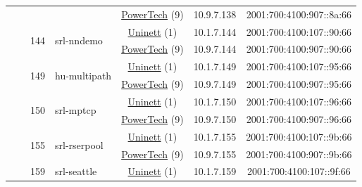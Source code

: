 \begin{small}
\begin{center}
\begin{longtable}{|c|c|c|c|c|c|c|c|}
  &  &  &  & \multicolumn{2}{|c|}{\tiny{\href{http://www.powertech.no}{PowerTech} (9)}} & \tiny{10.9.7.138} & \tiny{2001:700:4100:907::8a:66} \\* \cline{3-3}\cline{4-4}\cline{5-5}\cline{6-6}\cline{7-7}\cline{8-8}
  &  & \multirow{2}{*}{\tiny{144}} & \multicolumn{1}{|l|}{\multirow{2}{*}{\tiny{srl-nndemo}}} & \multicolumn{2}{|c|}{\tiny{\href{https://www.uninett.no}{Uninett} (1)}} & \tiny{10.1.7.144} & \tiny{2001:700:4100:107::90:66} \\* \cline{5-5}\cline{6-6}\cline{7-7}\cline{8-8}
  &  &  &  & \multicolumn{2}{|c|}{\tiny{\href{http://www.powertech.no}{PowerTech} (9)}} & \tiny{10.9.7.144} & \tiny{2001:700:4100:907::90:66} \\* \cline{3-3}\cline{4-4}\cline{5-5}\cline{6-6}\cline{7-7}\cline{8-8}
  &  & \multirow{2}{*}{\tiny{149}} & \multicolumn{1}{|l|}{\multirow{2}{*}{\tiny{hu-multipath}}} & \multicolumn{2}{|c|}{\tiny{\href{https://www.uninett.no}{Uninett} (1)}} & \tiny{10.1.7.149} & \tiny{2001:700:4100:107::95:66} \\* \cline{5-5}\cline{6-6}\cline{7-7}\cline{8-8}
  &  &  &  & \multicolumn{2}{|c|}{\tiny{\href{http://www.powertech.no}{PowerTech} (9)}} & \tiny{10.9.7.149} & \tiny{2001:700:4100:907::95:66} \\* \cline{3-3}\cline{4-4}\cline{5-5}\cline{6-6}\cline{7-7}\cline{8-8}
  &  & \multirow{2}{*}{\tiny{150}} & \multicolumn{1}{|l|}{\multirow{2}{*}{\tiny{srl-mptcp}}} & \multicolumn{2}{|c|}{\tiny{\href{https://www.uninett.no}{Uninett} (1)}} & \tiny{10.1.7.150} & \tiny{2001:700:4100:107::96:66} \\* \cline{5-5}\cline{6-6}\cline{7-7}\cline{8-8}
  &  &  &  & \multicolumn{2}{|c|}{\tiny{\href{http://www.powertech.no}{PowerTech} (9)}} & \tiny{10.9.7.150} & \tiny{2001:700:4100:907::96:66} \\* \cline{3-3}\cline{4-4}\cline{5-5}\cline{6-6}\cline{7-7}\cline{8-8}
  &  & \multirow{2}{*}{\tiny{155}} & \multicolumn{1}{|l|}{\multirow{2}{*}{\tiny{srl-rserpool}}} & \multicolumn{2}{|c|}{\tiny{\href{https://www.uninett.no}{Uninett} (1)}} & \tiny{10.1.7.155} & \tiny{2001:700:4100:107::9b:66} \\* \cline{5-5}\cline{6-6}\cline{7-7}\cline{8-8}
  &  &  &  & \multicolumn{2}{|c|}{\tiny{\href{http://www.powertech.no}{PowerTech} (9)}} & \tiny{10.9.7.155} & \tiny{2001:700:4100:907::9b:66} \\* \cline{3-3}\cline{4-4}\cline{5-5}\cline{6-6}\cline{7-7}\cline{8-8}
  &  & \multirow{2}{*}{\tiny{159}} & \multicolumn{1}{|l|}{\multirow{2}{*}{\tiny{srl-seattle}}} & \multicolumn{2}{|c|}{\tiny{\href{https://www.uninett.no}{Uninett} (1)}} & \tiny{10.1.7.159} & \tiny{2001:700:4100:107::9f:66} \\* \cline{5-5}\cline{6-6}\cline{7-7}\cline{8-8}

\end{longtable}
\end{center}
\end{small}
